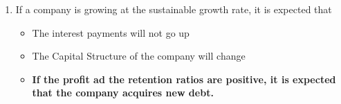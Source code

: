 \begin{scriptsize}
\begin{enumerate}[itemsep=0em]
\begin{itemize}[itemsep=0em]
          \end{itemize}
    \item If a company is growing at the sustainable growth rate, it is expected that
          \begin{itemize}[itemsep=0em]
            \item The interest payments will not go up
            \item The Capital Structure of the company will change
            \item \textbf{If the profit ad the retention ratios are positive, it is expected that the company acquires new debt.}
          \end{itemize}
  \end{enumerate}
\end{scriptsize}